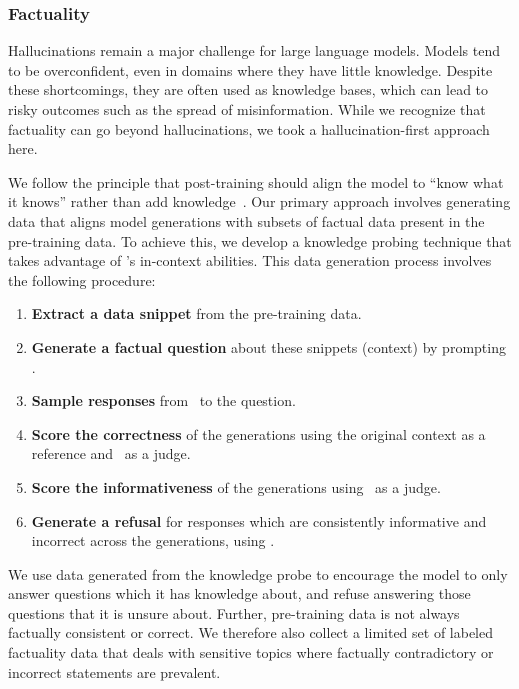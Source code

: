 \documentclass[dvipsnames]{fairmeta}
\begin{document}
\subsubsection{Factuality}\label{subsubsec:factuality}

Hallucinations remain a major challenge for large language models. Models tend to be overconfident, even in domains where they have little knowledge. Despite these shortcomings, they are often used as knowledge bases, which can lead to risky outcomes such as the spread of misinformation. While we recognize that factuality can go beyond hallucinations, we took a hallucination-first approach here.

We follow the principle that post-training should align the model to ``know what it knows'' rather than add knowledge~\citep{gekhman2024does,mielke2020metacognition}. Our primary approach involves generating data that aligns model generations with subsets of factual data present in the pre-training data. To achieve this, we develop a knowledge probing technique that takes advantage of \llamathree's in-context abilities. This data generation process involves the following procedure:

\begin{enumerate}
    \item \textbf{Extract a data snippet} from the pre-training data. 
    \item \textbf{Generate a factual question} about these snippets (context) by prompting \llamathree.
    \item \textbf{Sample responses} from \llamathree~to the question.
    \item \textbf{Score the correctness} of the generations using the original context as a reference and \llamathree~as a judge.
    \item \textbf{Score the informativeness} of the generations using \llamathree~as a judge.
    \item \textbf{Generate a refusal} for responses which are consistently informative and incorrect across the generations, using \llamathree.
\end{enumerate}

We use data generated from the knowledge probe to encourage the model to only answer questions which it has knowledge about, and refuse answering those questions that it is unsure about. 
Further, pre-training data is not always factually consistent or correct. We therefore also collect a limited set of labeled factuality data that deals with sensitive topics where factually contradictory or incorrect statements are prevalent. 
\end{document}
